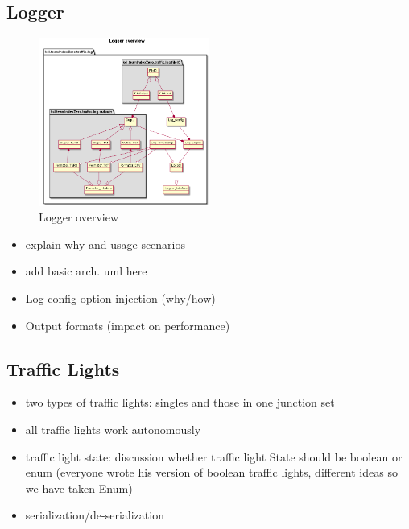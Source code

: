 \subsection{Logger}

\begin{figure}[h!]
	\vspace{1.5em}
  	\caption{Logger overview}
  	\label{fig:logger_overview}
  	\centering
	\includegraphics[width=0.5\textwidth]{figs/logModuleObjectDiagram.png}
  	\vspace{1.5em}
\end{figure}

    \begin{itemize}
        \item explain why and usage scenarios
        \item add basic arch. uml here
        \item Log config option injection (why/how)
        \item Output formats (impact on performance)
    \end{itemize}

\subsection{Traffic Lights}
\begin{itemize}
    \item two types of traffic lights: singles and those in one junction set
    \item all traffic lights work autonomously
	\item traffic light state: discussion whether traffic light State should be boolean or enum (everyone wrote his version of boolean traffic lights, different ideas so we have taken Enum)
\end{itemize}

\begin{itemize}
	\item serialization/de-serialization
\end{itemize}


